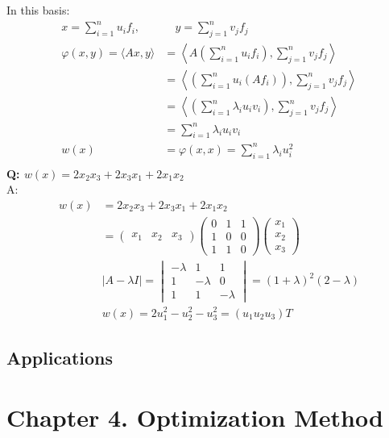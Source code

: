 In this basis:
\begin{align*}
    x = \sum_{i=1}^n u_i f_i, &\quad y = \sum_{j=1}^n v_j f_j\\
    \varphi(x, y) = \langle Ax, y \rangle 
    &= \left\langle A \left(\sum_{i=1}^n u_i f_i\right), \sum_{j=1}^n v_j f_j \right\rangle\\
    &= \left\langle \left(\sum_{i=1}^n u_i (Af_i)\right), \sum_{j=1}^n v_j f_j \right\rangle\\
    &= \left\langle \left(\sum_{i=1}^n \lambda_i u_i v_i\right), \sum_{j=1}^n v_j f_j \right\rangle\\
    &= \sum_{i=1}^n \lambda_i u_i v_i\\
    w(x) &= \varphi(x, x) = \sum_{i=1}^n \lambda_i u_i^2\\
\end{align*}
\textbf{Q: $w(x) = 2x_2x_3 + 2x_3x_1 + 2x_1x_2$}\\
A: \begin{align*}
    w(x) &= 2x_2x_3 + 2x_3x_1 + 2x_1x_2\\
    &= \begin{pmatrix}
        x_1 & x_2 & x_3
    \end{pmatrix}
    \begin{pmatrix}
        0 & 1 & 1\\
        1 & 0 & 0\\
        1 & 1 & 0
    \end{pmatrix}
    \begin{pmatrix}
        x_1\\
        x_2\\
        x_3
    \end{pmatrix}\\
    & |A - \lambda I| = \begin{vmatrix}
        -\lambda & 1 & 1\\
        1 & -\lambda & 0\\
        1 & 1 & -\lambda
    \end{vmatrix} = (1+\lambda)^2(2 - \lambda) \\
    &w(x) = 2u_1^2 - u_2^2 - u_3^2 = (u_1u_2u_3)T
\end{align*}

\subsection{Applications}

\newpage
\section{Chapter 4. Optimization Method}
